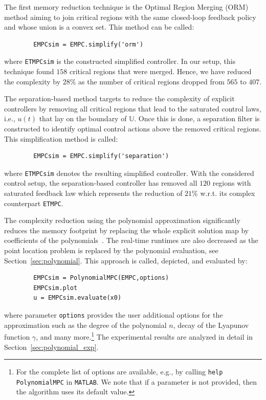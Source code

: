 \documentclass[letterpaper, 10 pt, conference]{ieeeconf}
\newcommand{\polydegree}{n}
\begin{document}
	The first memory reduction technique is the Optimal Region Merging (ORM) method aiming to join critical regions with the same closed-loop feedback policy and whose union is a convex set. This method can be called: 
	\begin{verbatim}
		EMPCsim = EMPC.simplify('orm')
	\end{verbatim}
	where \verb|ETMPCsim| is the constructed simplified controller. In our setup, this technique found $158$ critical regions that were merged. Hence, we have reduced the complexity by $28\%$ as the number of critical regions dropped from $565$ to $407$. 
	
	The separation-based method targets to reduce the complexity of explicit controllers by removing all critical regions that lead to the saturated control laws, i.e., $u(t)$ that lay on the boundary of $\mathbb{U}$. Once this is done, a separation filter is constructed to identify optimal control actions above the removed critical regions. This simplification method is called:
	\begin{verbatim}
		EMPCsim = EMPC.simplify('separation')
	\end{verbatim}
	where \verb|ETMPCsim| denotes the resulting simplified controller. With the considered control setup, the separation-based controller has removed all $120$ regions with saturated feedback law which represents the reduction of $21\%$ w.r.t. its complex counterpart \verb|ETMPC|.
	
	The complexity reduction using the polynomial approximation significantly reduces the memory footprint by replacing the whole explicit solution map by coefficients of the polynomials~\cite{KL11}. The real-time runtimes are also decreased as the point location problem is replaced by the polynomial evaluation, see Section~\ref{sec:polynomial}. This approach is called, depicted, and evaluated by:
	\begin{verbatim}
		EMPCsim = PolynomialMPC(EMPC,options)
		EMPCsim.plot
		u = EMPCsim.evaluate(x0)
	\end{verbatim}
	where parameter \verb|options| provides the user additional options for the approximation such as the degree of the polynomial $\polydegree$, decay of the Lyapunov function $\gamma$, and many more.\footnote{For the complete list of options are available, e.g., by calling \texttt{help PolynomialMPC} in \texttt{MATLAB}. We note that if a parameter is not provided, then the algorithm uses its default value.}
	The experimental results are analyzed in detail in Section~\ref{sec:polynomial_exp}.
	
\end{document}
